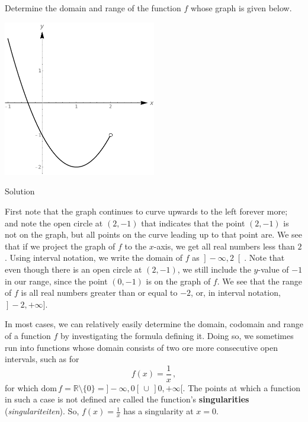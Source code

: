 \begin{example}
Determine the domain and range of the function $f$ whose graph is given below.
	\begin{center}
			\includegraphics[width=0.5\textwidth]{fig_functions_11}
	\end{center}

\pagebreak 
{}Solution 
	
   First note that the graph continues to curve upwards
   to the left forever more; and note the open circle at $(2,-1)$ that indicates that the point $(2,-1)$ is not on the graph, but all points on the curve leading up to that point are. We see  that if we project the graph of $f$ to the $x$-axis, we get all real numbers less than $2$.  Using interval notation, we write the domain of $f$ as $\left.\right]-\infty, 2\left.\right[$. Note that even though there is an open circle at $(2,-1)$, we still include the $y$-value of $-1$ in our range, since the point $(0,-1)$ is on the graph of $f$.  We see that the range of $f$ is all real numbers greater than or equal to $-2$, or, in interval notation,  $\left.\right]-2,+\infty]$.
\end{example}
\fi

In most cases, we can relatively easily determine the domain, codomain and range of a function $f$ by investigating the formula defining it.  Doing so, we sometimes run into functions whose domain consists of two ore more consecutive open intervals, such as for  $$f(x)=\frac{1}{x}\,,$$ for  which $\text{dom}\,f=\mathbb{R}\setminus\{0\}=]-\infty,0[\,\cup\, ]0,+\infty[$. The points at which a function in such a case is not defined are called the function's \textbf{singularities} (\textit{singulariteiten}). So, $f(x)=\frac{1}{x}$ has a singularity at $x=0$.


